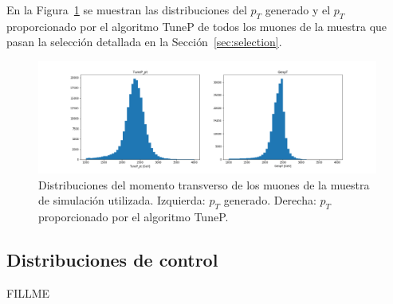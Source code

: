 En la Figura~\ref{fig:data_pt} se muestran las distribuciones del $p_{T}$ generado y el $p_{T}$ proporcionado por el algoritmo TuneP de todos los muones de la muestra que pasan la selecci\'on detallada en la Secci\'on~\ref{sec:selection}.

\begin{figure}[h]
\centering
\includegraphics[width=1.0\textwidth]{figures/data_pt.png}
\caption{Distribuciones del momento transverso de los muones de la muestra de simulaci\'on utilizada. Izquierda: $p_{T}$ generado. Derecha: $p_{T}$ proporcionado por el algoritmo TuneP.}
\label{fig:data_pt}        
\end{figure}

\subsection{Distribuciones de control}\label{sec:plots}

FILLME
